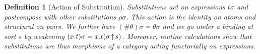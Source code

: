 \documentclass[format=acmsmall, screen, review, anonymous, timestamp]{acmart}
\newtheorem{defn}[thm]{Definition}
\begin{document}
\begin{defn}[Action of Substitution]
Substitutions act on expressions $t\sigma$ and postcompose with other
substitutions $\rho\sigma$. This action is the identity on atoms and
structural on pairs. We further have $(\#\theta)\sigma = \theta\sigma$
and we go under a binding at sort $s$ by weakening
$(x.t)\sigma = x.t(\sigma\!\uparrow\!s)$.
Moreover, routine calculations show that substitutions are thus
morphisms of a \emph{category} acting \emph{functorially} on expressions. 
\end{defn}
\end{document}
